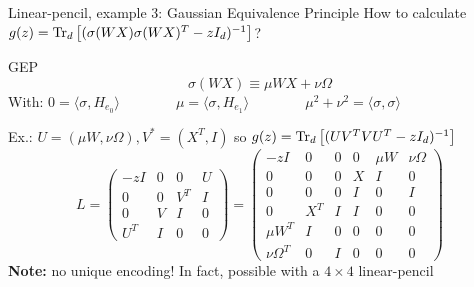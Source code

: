 \documentclass[10pt]{beamer}
\begin{document}
\begin{frame}{Linear-pencil, example 3: Gaussian Equivalence Principle}
  How to calculate $g(z) = \traceLim[d]{(\sigma(WX) \sigma(WX)^T - zI_d)^{-1}}$?
  \begin{block}{GEP \cite{pennington2017nonlinear}}
    \begin{equation}
      \sigma(WX) \equiv
      \mu W X + \nu \Omega
    \end{equation}
    With:
    $
      0 = \langle \sigma, H_{e_0} \rangle
      \qquad
      \qquad
      \mu = \langle \sigma, H_{e_1} \rangle
      \qquad
      \qquad
      \mu^2 + \nu^2 = \langle \sigma, \sigma \rangle
    $
  \end{block}
  Ex.: $U = (\mu W, \nu \Omega), V^* = (X^T, I)$ so $g(z) = \traceLim[d]{(U V^T V U^T - zI_d)^{-1}}$
  \begin{equation*}
    L = \begin{pmatrix}
      -z I & 0 & 0 & U\\
      0 & 0 & V^T & I\\
      0 & V & I & 0\\
      U^T & I & 0 & 0
    \end{pmatrix}
    = \begin{pmatrix}
      -z I & 0 & 0 & 0 & \mu W & \nu \Omega\\
      0  & 0 & 0 & X & I & 0\\
      0  & 0 & 0& I & 0 & I\\
      0 & X^T & I & I & 0 & 0\\
      \mu W^T  & I & 0 & 0 & 0 & 0\\
      \nu \Omega^T & 0 & I & 0 & 0 & 0
    \end{pmatrix}
  \end{equation*}
  \textbf{Note:} no unique encoding! In fact, possible with a $4\times 4$ linear-pencil
\end{frame}
\end{document}
